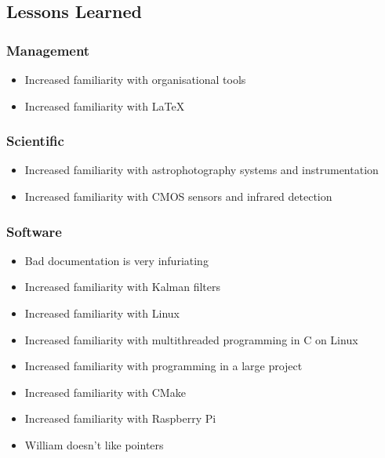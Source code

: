 \pagebreak
\subsection{Lessons Learned}

\subsubsection{Management}

\begin{itemize}
    \item Increased familiarity with organisational tools
    \item Increased familiarity with LaTeX
\end{itemize}


\subsubsection{Scientific}

\begin{itemize}
    \item Increased familiarity with astrophotography systems and instrumentation
    \item Increased familiarity with CMOS sensors and infrared detection
\end{itemize}

\begin{comment}
\subsubsection{Electrical}

\begin{itemize}
    \item Friendship
    \item Sleep deprivation
\end{itemize}

\end{comment}
\subsubsection{Software}

\begin{itemize}
    \item Bad documentation is very infuriating
    \item Increased familiarity with Kalman filters
    \item Increased familiarity with Linux
    \item Increased familiarity with multithreaded programming in C on Linux
    \item Increased familiarity with programming in a large project
    \item Increased familiarity with CMake
    \item Increased familiarity with Raspberry Pi
    \item William doesn't like pointers
\end{itemize}

